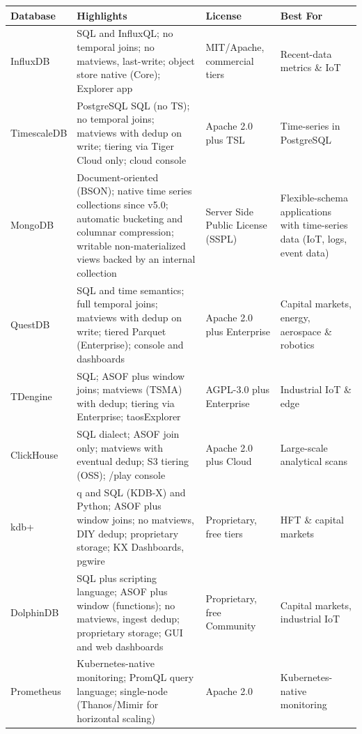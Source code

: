 \begin{table}[htbp]
\centering
\small
\setlength{\tabcolsep}{4pt} %
\begin{tabularx}{\textwidth}{|>{\raggedright\arraybackslash}p{2.2cm}|X|>{\raggedright\arraybackslash}p{2.6cm}|X|}
\hline
\textbf{Database} & \textbf{Highlights} & \textbf{License} & \textbf{Best For} \\
\hline
InfluxDB & SQL and InfluxQL; no temporal joins; no matviews, last-write; object store native (Core); Explorer app & MIT/Apache, commercial tiers & Recent-data metrics \& IoT \\
\hline
TimescaleDB & PostgreSQL SQL (no TS); no temporal joins; matviews with dedup on write; tiering via Tiger Cloud only; cloud console & Apache 2.0 plus TSL & Time-series in PostgreSQL \\
\hline
MongoDB & Document-oriented (BSON); native time series collections since v5.0; automatic bucketing and columnar compression; writable non-materialized views backed by an internal collection & Server Side Public License (SSPL) & Flexible-schema applications with time-series data (IoT, logs, event data) \\
\hline
QuestDB & SQL and time semantics; full temporal joins; matviews with dedup on write; tiered Parquet (Enterprise); console and dashboards & Apache 2.0 plus Enterprise & Capital markets, energy, aerospace \& robotics \\
\hline
TDengine & SQL; ASOF plus window joins; matviews (TSMA) with dedup; tiering via Enterprise; taosExplorer & AGPL-3.0 plus Enterprise & Industrial IoT \& edge \\
\hline
ClickHouse & SQL dialect; ASOF join only; matviews with eventual dedup; S3 tiering (OSS); /play console & Apache 2.0 plus Cloud & Large-scale analytical scans \\
\hline
kdb+ & q and SQL (KDB-X) and Python; ASOF plus window joins; no matviews, DIY dedup; proprietary storage; KX Dashboards, pgwire & Proprietary, free tiers & HFT \& capital markets \\
\hline
DolphinDB & SQL plus scripting language; ASOF plus window (functions); no matviews, ingest dedup; proprietary storage; GUI and web dashboards & Proprietary, free Community & Capital markets, industrial IoT \\
\hline
Prometheus & Kubernetes-native monitoring; PromQL query language; single-node (Thanos/Mimir for horizontal scaling) & Apache 2.0 & Kubernetes-native monitoring \\

\end{tabularx}
\end{table}
